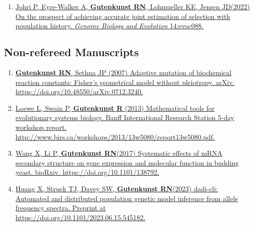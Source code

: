 \documentclass[11pt]{article}
\begin{document}
\begin{enumerate}
\item \href{https://doi.org/10.1093/gbe/evac088}{Johri P\corresponding, Eyre-Walker A, \textbf{Gutenkunst RN}, Lohmueller KE, Jensen JD\corresponding (2022) On the prospect of achieving accurate joint estimation of selection with population history. \emph{Genome Biology and Evolution} 14:evac088.}
\end{enumerate}


\subsection*{Non-refereed Manuscripts}
\begin{enumerate}
\item \href{ https://doi.org/10.48550/arXiv.0712.3240}{\grad \textbf{Gutenkunst RN}, Sethna JP (2007) Adaptive mutation of biochemical reaction constants: Fisher's geometrical model without pleiotropy. arXiv.
https://doi.org/10.48550/arXiv.0712.3240.}

\item \href{http://www.birs.ca/workshops/2013/13w5080/report13w5080.pdf}{Loewe L, Swain P, \textbf{Gutenkunst R} (2013) Mathematical tools for evolutionary systems biology. Banff International Research Station 5-day workshop report.\\http://www.birs.ca/workshops/2013/13w5080/report13w5080.pdf.}

\item \href{https://doi.org/10.1101/138792}{Wang X\trainee, Li P, \textbf{Gutenkunst RN}\corresponding (2017) Systematic effects of mRNA secondary structure on gene expression and molecular function in budding yeast. bioRxiv. https://doi.org/10.1101/138792.}

\item \href{https://doi.org/10.1101/2023.06.15.545182}{Huang X\trainee\equal\corresponding, Struck TJ\trainee\equal, Davey SW, \textbf{Gutenkunst RN}\corresponding (2023) dadi-cli: Automated and distributed population genetic model inference from allele frequency spectra. Preprint at\\https://doi.org/10.1101/2023.06.15.545182.}


\end{enumerate}
\end{document}
